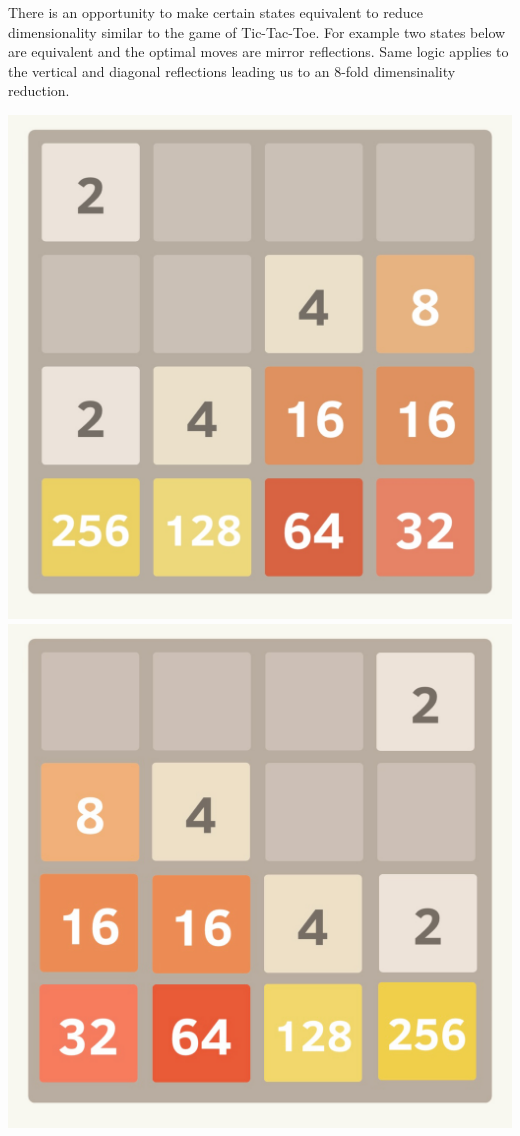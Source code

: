 \documentclass[letterpaper]{article} %
\begin{document}
There is an opportunity to make certain states equivalent to reduce dimensionality similar to the game of Tic-Tac-Toe. For example two states below are equivalent and the optimal moves are mirror reflections. Same logic applies to the vertical and diagonal reflections leading us to an 8-fold dimensinality reduction.

\begin{center}
    \includegraphics[scale=.05]{images/grid.jpg}
    \includegraphics[scale=.05]{images/grid-reflect.jpg}
\end{center}
\end{document}
